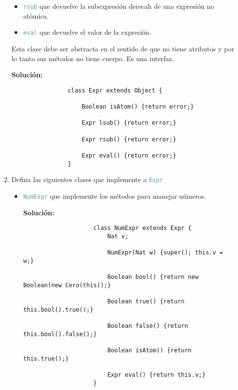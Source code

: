 \documentclass{article}
\newcommand{\tx}[1]{\textcolor{CadetBlue} {\texttt{#1}}}
\newcommand{\tb}[1]{\textcolor{RoyalPurple} {\textbf{#1}}}
\begin{document}
\begin{enumerate}
\begin{enumerate}
\begin{itemize}
                \item \tx{rsub} que devuelve la subexpresión derecah de una
                expresión no atómica.

                \item \tx{eval} que devuelve el valor de la expresión.
            \end{itemize}

            Esta clase debe ser abstracta en el sentido de que no tiene 
            atributos y por lo tanto sus métodos no tiene cuerpo. Es una 
            interfaz.

            \tb{Solución:}

            \begin{verbatim}
                class Expr extends Object {

                    Boolean isAtom() {return error;}

                    Expr lsub() {return error;}

                    Expr rsub() {return error;}

                    Expr eval() {return error;}
                }
            \end{verbatim}

            \item Defina las siguientes clases que implemente a \tx{Expr}
            
            \begin{itemize}
                \item \tx{NumExpr} que implemente los métodos para manejar 
                números.

                \tb{Solución:}

                \begin{verbatim}
                    class NumExpr extends Expr {
                        Nat v;

                        NumExpr(Nat w) {super(); this.v = w;}

                        Boolean bool() {return new Boolean(new Cero(this));}

                        Boolean true() {return this.bool().true();}

                        Boolean false() {return this.bool().false();}

                        Boolean isAtom() {return this.true();}

                        Expr eval() {return this.v;}
                    }
                \end{verbatim}


\end{itemize}
\end{enumerate}
\end{enumerate}
\end{document}
